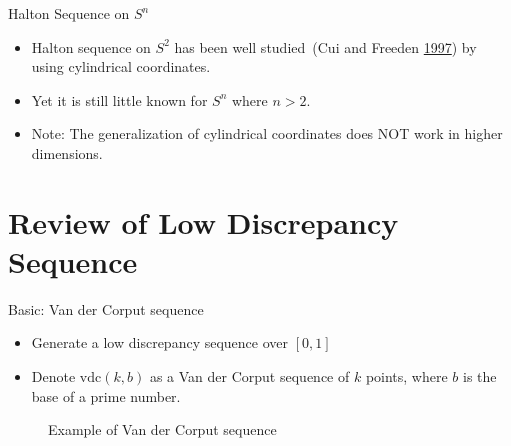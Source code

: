 \documentclass[10pt,ignorenonframetext,serif,onlymath]{beamer}
\begin{document}
\begin{frame}{Halton Sequence on \(S^n\)}
\protect\hypertarget{halton-sequence-on-sn}{}

\begin{itemize}
\item
  Halton sequence on \(S^2\) has been well studied~(Cui and Freeden
  \protect\hyperlink{ref-cui1997equidistribution}{1997}) by using
  cylindrical coordinates.
\item
  Yet it is still little known for \(S^n\) where \(n>2\).
\item
  Note: The generalization of cylindrical coordinates does NOT work in
  higher dimensions.
\end{itemize}

\end{frame}

\hypertarget{review-of-low-discrepancy-sequence}{%
\section{Review of Low Discrepancy
Sequence}\label{review-of-low-discrepancy-sequence}}

\begin{frame}{Basic: Van der Corput sequence}
\protect\hypertarget{basic-van-der-corput-sequence}{}

\begin{itemize}
\item
  Generate a low discrepancy sequence over \([0,1]\)
\item
  Denote \(\mathrm{vdc}(k,b)\) as a Van der Corput sequence of \(k\)
  points, where \(b\) is the base of a prime number.
\end{itemize}

\begin{figure}[hp]
\centering

\caption{Example of Van der Corput sequence}%
\label{fig:vdc}
\end{figure}

\end{frame}
\end{document}
